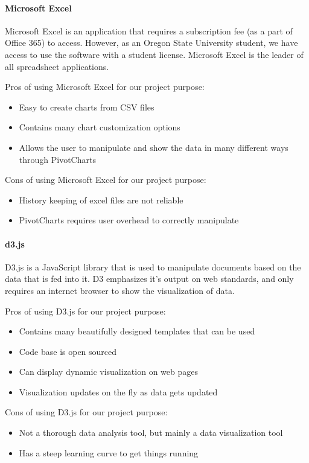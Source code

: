 \paragraph{Microsoft Excel}
Microsoft Excel is an application that requires a subscription fee (as a part of Office 365) to access.
However, as an Oregon State University student, we have access to use the software with a student license.
Microsoft Excel is the leader of all spreadsheet applications.

Pros of using Microsoft Excel for our project purpose:
\begin{itemize}
\item Easy to create charts from CSV files
\item Contains many chart customization options
\item Allows the user to manipulate and show the data in many different ways through PivotCharts
\end{itemize}

Cons of using Microsoft Excel for our project purpose:
\begin{itemize}
\item History keeping of excel files are not reliable
\item PivotCharts requires user overhead to correctly manipulate
\end{itemize}

\paragraph{d3.js}
D3.js is a JavaScript library that is used to manipulate documents based on the data that is fed into it.
D3 emphasizes it's output on web standards, and only requires an internet browser to show the visualization of data.

Pros of using D3.js for our project purpose:
\begin{itemize}
\item Contains many beautifully designed templates that can be used
\item Code base is open sourced
\item Can display dynamic visualization on web pages
\item Visualization updates on the fly as data gets updated
\end{itemize}

Cons of using D3.js for our project purpose:
\begin{itemize}
\item Not a thorough data analysis tool, but mainly a data visualization tool
\item Has a steep learning curve to get things running
\end{itemize}

